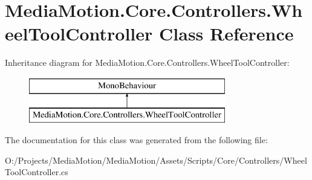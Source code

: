 \hypertarget{class_media_motion_1_1_core_1_1_controllers_1_1_wheel_tool_controller}{\section{Media\+Motion.\+Core.\+Controllers.\+Wheel\+Tool\+Controller Class Reference}
\label{class_media_motion_1_1_core_1_1_controllers_1_1_wheel_tool_controller}
}
Inheritance diagram for Media\+Motion.\+Core.\+Controllers.\+Wheel\+Tool\+Controller\+:\begin{figure}[H]
\begin{center}
\leavevmode
\includegraphics[height=2.000000cm]{class_media_motion_1_1_core_1_1_controllers_1_1_wheel_tool_controller}
\end{center}
\end{figure}


The documentation for this class was generated from the following file\+:\begin{DoxyCompactItemize}
\item 
O\+:/\+Projects/\+Media\+Motion/\+Media\+Motion/\+Assets/\+Scripts/\+Core/\+Controllers/Wheel\+Tool\+Controller.\+cs\end{DoxyCompactItemize}
